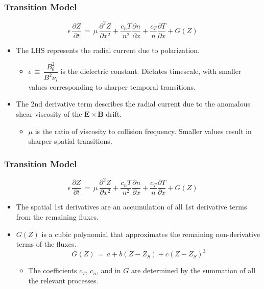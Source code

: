 \documentclass{beamer}
\begin{document}
\begin{frame}
\frametitle{Transition Model}
\begin{equation*}
	\epsilon\,\frac{\partial Z}{\partial t} \,=\, \mu\,\frac{\partial^2 Z}{\partial x^2} + \frac{c_n T}{n^2} \frac{\partial n}{\partial x} + \frac{c_T}{n} \frac{\partial T}{\partial x} + G(Z)
\end{equation*}
	\begin{itemize}
		\item The LHS represents the radial current due to polarization.
		\begin{itemize}
			\item $\epsilon \,\equiv\, \dfrac{B_\theta^2}{B^2 \nu_i}$ is the dielectric constant.
			Dictates timescale, with smaller values corresponding to sharper temporal transitions.
		\end{itemize}
		\item The 2nd derivative term describes the radial current due to the anomalous shear viscosity of the $\mathbf{E}\times\mathbf{B}$ drift.
		\begin{itemize}
			\item $\mu$ is the ratio of viscosity to collision frequency. Smaller values result in sharper spatial transitions.
		\end{itemize}
	\end{itemize}
\end{frame}

\begin{frame}
\frametitle{Transition Model}
\begin{equation*}
	\epsilon\,\frac{\partial Z}{\partial t} \,=\, \mu\,\frac{\partial^2 Z}{\partial x^2} + \frac{c_n T}{n^2} \frac{\partial n}{\partial x} + \frac{c_T}{n} \frac{\partial T}{\partial x} + G(Z)
\end{equation*}
	\begin{itemize}
		\item The spatial 1st derivatives are an accumulation of all 1st derivative terms from the remaining fluxes.
		\item $G(Z)$ is a cubic polynomial that approximates the remaining non-derivative terms of the fluxes.
		\begin{equation*}
			G(Z) \,=\, a + b(Z - Z_S) + c(Z - Z_S)^3
			\label{eq:G_func}
		\end{equation*}
		\begin{itemize}
			\item The coefficients $c_T$, $c_n$, and in $G$ are determined by the summation of all the relevant processes.
		\end{itemize}
	\end{itemize}
\end{frame}
\end{document}

